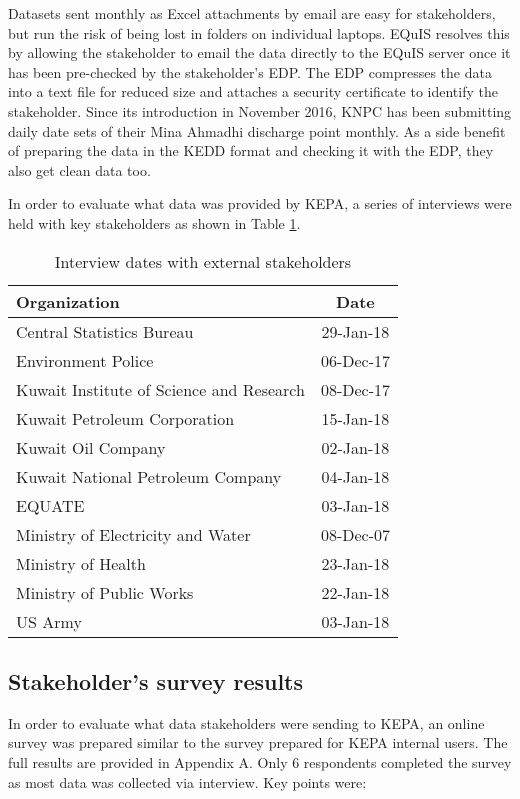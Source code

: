 Datasets sent monthly as Excel attachments by email are easy for stakeholders, but run the risk of being lost in folders on individual laptops. EQuIS resolves this by allowing the stakeholder to email the data directly to the EQuIS server once it has been pre-checked by the stakeholder's EDP. The EDP compresses the data into a text file for reduced size and attaches a security certificate to identify the stakeholder. Since its introduction in November 2016, KNPC has been submitting daily date sets of their Mina Ahmadhi discharge point monthly. As a side benefit of preparing the data in the KEDD format and checking it with the EDP, they also get clean data too.

In order to evaluate what data was provided by KEPA, a series of interviews were held with key stakeholders as shown in Table \ref{tab:external}.

\begin{table}[H]
\centering
\caption{Interview dates with external stakeholders}
\label{tab:external}
\begin{tabular}{@{}lc@{}}
\toprule
\textbf{Organization} & \textbf{Date} \\ \midrule
Central Statistics Bureau & 29-Jan-18 \\
Environment Police & 06-Dec-17 \\
Kuwait Institute of Science and Research & 08-Dec-17 \\
Kuwait Petroleum Corporation & 15-Jan-18 \\
Kuwait Oil Company & 02-Jan-18 \\
Kuwait National Petroleum Company & 04-Jan-18 \\
EQUATE & 03-Jan-18 \\
Ministry of Electricity and Water & 08-Dec-07 \\
Ministry of Health & 23-Jan-18 \\
Ministry of Public Works & 22-Jan-18 \\
US Army & 03-Jan-18 \\ \bottomrule
\end{tabular}
\end{table}

\subsection{Stakeholder's survey results}
In order to evaluate what data stakeholders were sending to KEPA, an online survey was prepared similar to the survey prepared for KEPA internal users. The full results are provided in Appendix A. Only 6 respondents completed the survey as most data was collected via interview. Key points were:


